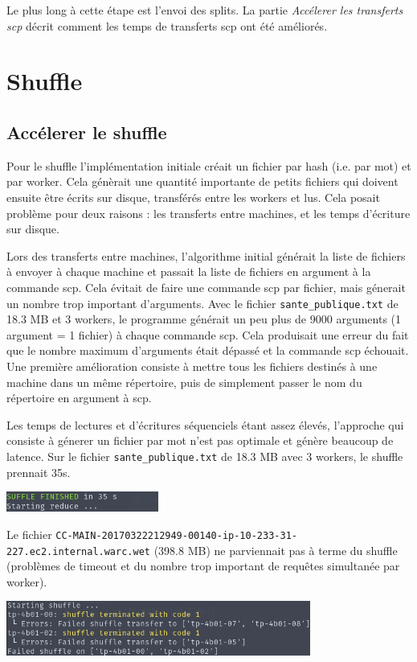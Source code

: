 \documentclass[11pt,a4paper]{article}
\begin{document}
Le plus long à cette étape est l'envoi des splits. La partie \textit{Accélerer les transferts scp} décrit comment les temps de transferts scp ont été améliorés.

\section{Shuffle}
\subsection*{Accélerer le shuffle}
Pour le shuffle l'implémentation initiale créait un fichier par hash (i.e. par mot) et par worker. Cela génèrait une quantité importante de petits fichiers qui doivent ensuite être écrits sur disque, transférés entre les workers et lus. Cela posait problème pour deux raisons : les transferts entre machines, et les temps d'écriture sur disque.

Lors des transferts entre machines, l'algorithme initial générait la liste de fichiers à envoyer à chaque machine et passait la liste de fichiers en argument à la commande scp. Cela évitait de faire une commande scp par fichier, mais génerait un nombre trop important d'arguments. Avec le fichier \verb|sante_publique.txt| de 18.3 MB et 3 workers, le programme générait un peu plus de 9000 arguments (1 argument = 1 fichier) à chaque commande scp. Cela produisait une erreur du fait que le nombre maximum d'arguments était dépassé et la commande scp échouait. Une première amélioration consiste à mettre tous les fichiers destinés à une machine dans un même répertoire, puis de simplement passer le nom du répertoire en argument à scp. 

Les temps de lectures et d'écritures séquenciels étant assez élevés, l'approche qui consiste à génerer un fichier par mot n'est pas optimale et génère beaucoup de latence. Sur le fichier \texttt{sante\_publique.txt} de 18.3 MB avec 3 workers, le shuffle prennait 35s.

\includegraphics[width=5cm]{screenshot_shuffle1.png}

Le fichier \texttt{CC-MAIN-20170322212949-00140-ip-10-233-31-227.ec2.internal.warc.wet} (398.8 MB) ne parviennait pas à terme du shuffle (problèmes de timeout et du nombre trop important de requêtes simultanée par worker).

\includegraphics[width=10cm]{screenshot_shuffle2.png}
\end{document}
